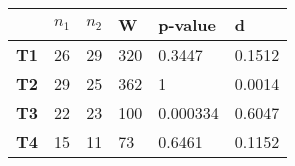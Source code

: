\begin{tabular}{llllll}
\hline
            & \textbf{$n_1$} & \textbf{$n_2$} & \textbf{W} & \textbf{p-value} & \textbf{d} \\ \hline
\textbf{T1} & 26                      & 29                       & 320        & 0.3447           & 0.1512     \\
\textbf{T2} & 29                      & 25                       & 362        & 1                & 0.0014     \\
\textbf{T3} & 22                      & 23                       & 100        & 0.000334         & 0.6047     \\
\textbf{T4} & 15                      & 11                       & 73         & 0.6461           & 0.1152     \\ \hline
\end{tabular}
